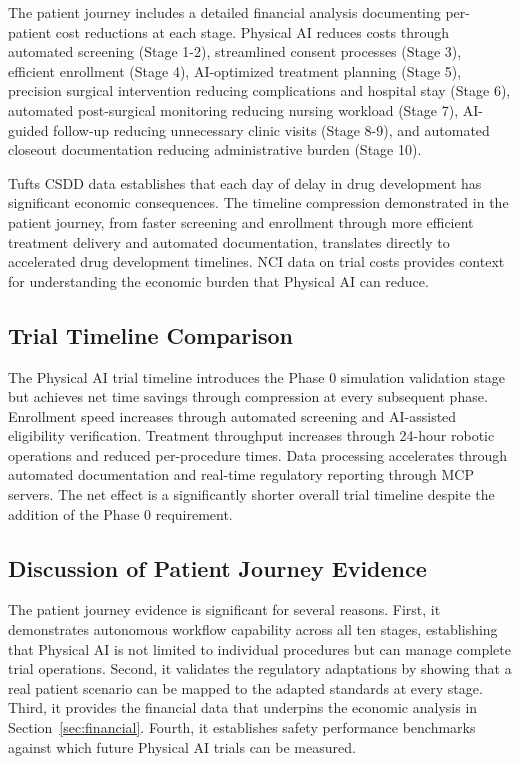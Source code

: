 The patient journey includes a detailed financial analysis documenting
per-patient cost reductions at each stage. Physical AI reduces costs through
automated screening (Stage 1-2), streamlined consent processes (Stage 3),
efficient enrollment (Stage 4), AI-optimized treatment planning (Stage 5),
precision surgical intervention reducing complications and hospital stay
(Stage 6), automated post-surgical monitoring reducing nursing workload
(Stage 7), AI-guided follow-up reducing unnecessary clinic visits (Stage 8-9),
and automated closeout documentation reducing administrative burden (Stage 10).

Tufts CSDD data \cite{tufts-delay} establishes that each day of delay in drug
development has significant economic consequences. The timeline compression
demonstrated in the patient journey, from faster screening and enrollment
through more efficient treatment delivery and automated documentation,
translates directly to accelerated drug development timelines. NCI data on
trial costs \cite{nci-trials-paying} provides context for understanding the
economic burden that Physical AI can reduce.

\subsection{Trial Timeline Comparison}
\label{subsec:journey-timeline}

The Physical AI trial timeline introduces the Phase 0 simulation validation
stage but achieves net time savings through compression at every subsequent
phase. Enrollment speed increases through automated screening and AI-assisted
eligibility verification. Treatment throughput increases through 24-hour
robotic operations and reduced per-procedure times. Data processing accelerates
through automated documentation and real-time regulatory reporting through MCP
servers. The net effect is a significantly shorter overall trial timeline
despite the addition of the Phase 0 requirement.

\subsection{Discussion of Patient Journey Evidence}
\label{subsec:journey-discussion}

The patient journey evidence is significant for several reasons. First, it
demonstrates autonomous workflow capability across all ten stages, establishing
that Physical AI is not limited to individual procedures but can manage
complete trial operations. Second, it validates the regulatory adaptations by
showing that a real patient scenario can be mapped to the adapted standards at
every stage. Third, it provides the financial data that underpins the economic
analysis in Section~\ref{sec:financial}. Fourth, it establishes safety
performance benchmarks against which future Physical AI trials can be measured.

